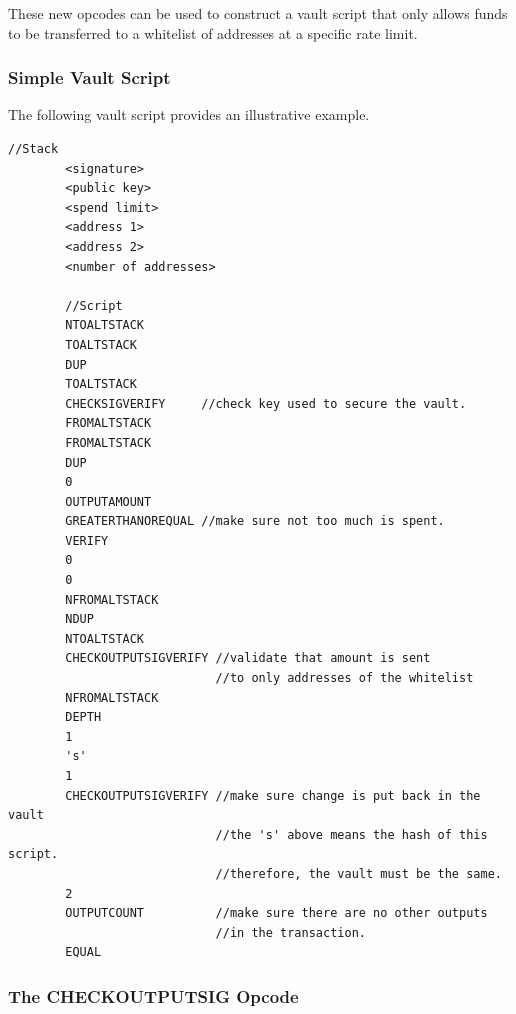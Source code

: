 \documentclass{article}
\begin{document}
These new opcodes can be used to construct a vault script that only allows funds
to be transferred to a whitelist of addresses at a specific rate limit.


\subsubsection{Simple Vault Script}
The following vault script provides an illustrative example.

\newpage

\begin{center}
    \begin{lstlisting}[caption=Simple Vault Script,basicstyle=\small]
        //Stack
        <signature>
        <public key>
        <spend limit>
        <address 1>
        <address 2>
        <number of addresses>

        //Script
        NTOALTSTACK              
        TOALTSTACK               
        DUP                 
        TOALTSTACK          
        CHECKSIGVERIFY     //check key used to secure the vault.
        FROMALTSTACK        
        FROMALTSTACK        
        DUP                 
        0                      
        OUTPUTAMOUNT       
        GREATERTHANOREQUAL //make sure not too much is spent.
        VERIFY              
        0                      
        0                      
        NFROMALTSTACK       
        NDUP                
        NTOALTSTACK         
        CHECKOUTPUTSIGVERIFY //validate that amount is sent
                             //to only addresses of the whitelist
        NFROMALTSTACK       
        DEPTH               
        1                      
        's'                    
        1                      
        CHECKOUTPUTSIGVERIFY //make sure change is put back in the vault
                             //the 's' above means the hash of this script.
                             //therefore, the vault must be the same.
        2                      
        OUTPUTCOUNT          //make sure there are no other outputs
                             //in the transaction.
        EQUAL               
    \end{lstlisting}
\end{center}

\subsubsection{The CHECKOUTPUTSIG Opcode}
\end{document}
